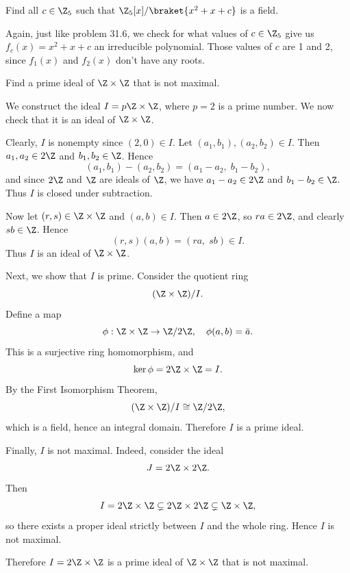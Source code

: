 \begin{problem}[31.8]
  Find all $c \in \Z_5$ such that $\Z_5[x]/\braket{x^2 + x + c}$ is a field.
\end{problem}

\begin{solution}
  Again, just like problem 31.6, we check for what values of $c \in \Z_5$ give us $f_c(x) = x^2 + x + c$ an irreducible polynomial. Those values of $c$ are 1 and 2, since $f_1(x)$ and $f_2(x)$ don't have any roots.
\end{solution}

\begin{problem}[31.16]
  Find a prime ideal of $\Z \times \Z$ that is not maximal.
\end{problem}

\begin{solution}
  We construct the ideal $I = p\Z \times \Z$, where $p = 2$ is a prime number. We now check that it is an ideal of $\Z \times \Z$.

  Clearly, $I$ is nonempty since $(2,0) \in I$. Let $(a_1,b_1), (a_2,b_2) \in I$. Then $a_1, a_2 \in 2\Z$ and $b_1, b_2 \in \Z$. Hence
  \[%
    (a_1,b_1) - (a_2,b_2) = (a_1 - a_2,\; b_1 - b_2)
  ,\]%
  and since $2\Z$ and $\Z$ are ideals of $\Z$, we have $a_1 - a_2 \in 2\Z$ and $b_1 - b_2 \in \Z$. Thus $I$ is closed under subtraction.

  Now let $(r,s) \in \Z \times \Z$ and $(a,b) \in I$. Then $a \in 2\Z$, so $ra \in 2\Z$, and clearly $sb \in \Z$. Hence
  \[%
    (r,s)(a,b) = (ra,\; sb) \in I
  .\]%
  Thus $I$ is an ideal of $\Z \times \Z$.

  Next, we show that $I$ is prime. Consider the quotient ring
  \[%
    (\Z \times \Z)/I
  .\]%
  Define a map
  \[%
    \phi : \Z \times \Z \to \Z/2\Z, \quad \phi(a,b) = \bar{a}
  .\]%
  This is a surjective ring homomorphism, and
  \[%
    \ker \phi = 2\Z \times \Z = I
  .\]%
  By the First Isomorphism Theorem,
  \[%
    (\Z \times \Z)/I \cong \Z/2\Z
  ,\]%
  which is a field, hence an integral domain. Therefore $I$ is a prime ideal.

  Finally, $I$ is not maximal. Indeed, consider the ideal
  \[%
    J = 2\Z \times 2\Z
  .\]%
  Then
  \[%
    I = 2\Z \times \Z \subsetneq 2\Z \times 2\Z \subsetneq \Z \times \Z
  ,\]%
  so there exists a proper ideal strictly between $I$ and the whole ring. Hence $I$ is not maximal.

  Therefore $I = 2\Z \times \Z$ is a prime ideal of $\Z \times \Z$ that is not maximal.
\end{solution}

